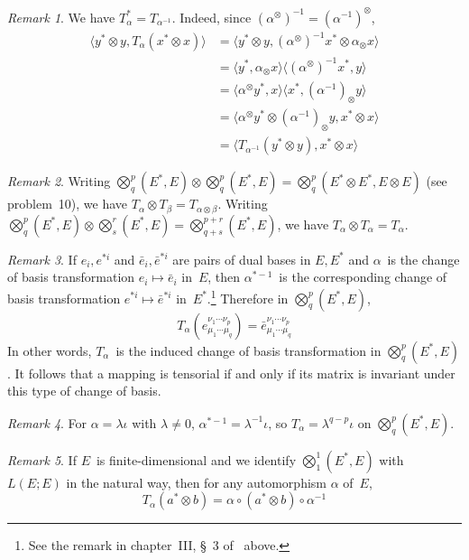 \documentclass[letterpaper,12pt]{article}
\newcommand{\after}{\circ}
\newcommand{\tprod}{\otimes}
\newcommand{\bigtprod}{\bigotimes}
\newcommand{\medtprod}{{\textstyle\bigtprod}}
\newcommand{\sprod}[2]{\langle#1,#2\rangle}
\theoremstyle{definition}
\theoremstyle{remark}
\newtheorem*{rmk}{Remark}
\begin{document}
\begin{rmk}
We have \(T_{\alpha}^*=T_{\alpha^{-1}}\). Indeed, since \((\alpha^{\tprod})^{-1}=(\alpha^{-1})^{\tprod}\),
\begin{align*}
\sprod{y^*\tprod y}{T_{\alpha}(x^*\tprod x)}&=\sprod{y^*\tprod y}{(\alpha^{\tprod})^{-1}x^*\tprod\alpha_{\tprod}x}\\
	&=\sprod{y^*}{\alpha_{\tprod}x}\sprod{(\alpha^{\tprod})^{-1}x^*}{y}\\
	&=\sprod{\alpha^{\tprod}y^*}{x}\sprod{x^*}{(\alpha^{-1})_{\tprod}y}\\
	&=\sprod{\alpha^{\tprod}y^*\tprod(\alpha^{-1})_{\tprod}y}{x^*\tprod x}\\
	&=\sprod{T_{\alpha^{-1}}(y^*\tprod y)}{x^*\tprod x}
\end{align*}
\end{rmk}

\begin{rmk}
Writing \(\medtprod^p_q(E^*,E)\tprod\medtprod^p_q(E^*,E)=\medtprod^p_q(E^*\tprod E^*,E\tprod E)\) (see problem~10), we have \(T_{\alpha}\tprod T_{\beta}=T_{\alpha\tprod\beta}\). Writing \(\medtprod^p_q(E^*,E)\tprod\medtprod^r_s(E^*,E)=\medtprod^{p+r}_{q+s}(E^*,E)\), we have \(T_{\alpha}\tprod T_{\alpha}=T_{\alpha}\).
\end{rmk}

\begin{rmk}
If \(e_i,e^{*i}\) and \(\bar{e}_i,\bar{e}^{*i}\) are pairs of dual bases in \(E,E^*\) and \(\alpha\)~is the change of basis transformation \(e_i\mapsto\bar{e}_i\) in~\(E\), then \(\alpha^{*-1}\)~is the corresponding change of basis transformation \(e^{*i}\mapsto\bar{e}^{*i}\) in~\(E^*\).\footnote{See the remark in chapter~III, \S~3 of~\cite{greub1} above.} Therefore in \(\medtprod^p_q(E^*,E)\),
\[T_{\alpha}(e^{\nu_1\cdots\nu_p}_{\mu_1\cdots\mu_q})=\bar{e}^{\nu_1\cdots\nu_p}_{\mu_1\cdots\mu_q}\]
In other words, \(T_{\alpha}\)~is the induced change of basis transformation in \(\medtprod^p_q(E^*,E)\). It follows that a mapping is tensorial if and only if its matrix is invariant under this type of change of basis.
\end{rmk}

\begin{rmk}
For \(\alpha=\lambda\iota\) with \(\lambda\ne0\), \(\alpha^{*-1}=\lambda^{-1}\iota\), so \(T_{\alpha}=\lambda^{q-p}\iota\) on \(\medtprod^p_q(E^*,E)\).
\end{rmk}

\begin{rmk}
If \(E\)~is finite-dimensional and we identify \(\medtprod^1_1(E^*,E)\) with \(L(E;E)\) in the natural way, then for any automorphism \(\alpha\) of~\(E\),
\[T_{\alpha}(a^*\tprod b)=\alpha\after(a^*\tprod b)\after\alpha^{-1}\]
\end{rmk}
\end{document}
